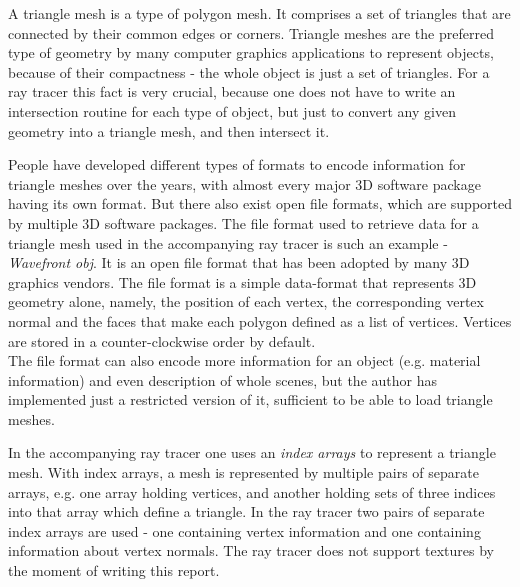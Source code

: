 \documentclass{article}
\begin{document}
A triangle mesh is a type of polygon mesh. It comprises a set of triangles that are connected by their common edges or corners. Triangle meshes are the preferred type of geometry by many computer graphics applications to represent objects, because of their compactness - the whole object is just a set of triangles. For a ray tracer this fact is very crucial, because one does not have to write an intersection routine for each type of object, but just to convert any given geometry into a triangle mesh, and then intersect it.

\vspace*{\baselineskip}

People have developed different types of formats to encode information for triangle meshes over the years, with almost every major 3D software package having its own format. But there also exist open file formats, which are supported by multiple 3D software packages. The file format used to retrieve data for a triangle mesh used in the accompanying ray tracer is such an example - \textit{Wavefront obj}. It is an open file format that has been adopted by many 3D graphics vendors. The file format is a simple data-format that represents 3D geometry alone, namely, the position of each vertex, the corresponding vertex normal and the faces that make each polygon defined as a list of vertices. Vertices are stored in a counter-clockwise order by default. \cite{obj} \\
The file format can also encode more information for an object (e.g. material information) and even description of whole scenes, but the author has implemented just a restricted version of it, sufficient to be able to load triangle meshes. 

\vspace*{\baselineskip}

In the accompanying ray tracer one uses an \textit{index arrays} to represent a triangle mesh. With index arrays, a mesh is represented by multiple pairs of separate arrays, e.g. one array holding vertices, and another holding sets of three indices into that array which define a triangle. In the ray tracer two pairs of separate index arrays are used - one containing vertex information and one containing information about vertex normals. The ray tracer does not support textures by the moment of writing this report. 

\vspace*{\baselineskip}
\end{document}
